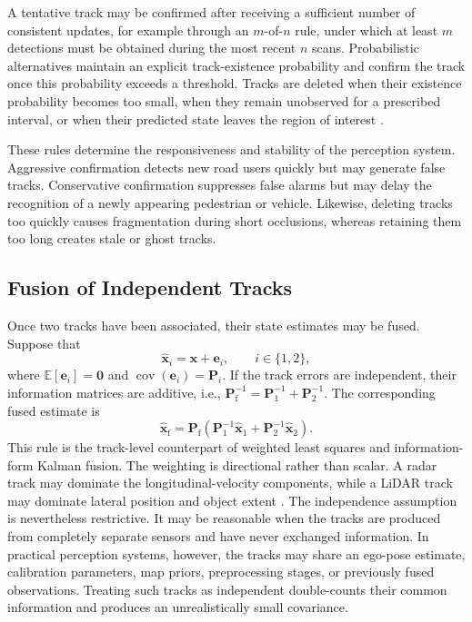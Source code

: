 \documentclass[11pt,oneside,openany]{book}
\begin{document}
A tentative track may be confirmed after receiving a sufficient number of
consistent updates, for example through an $m$-of-$n$ rule, under which at
least $m$ detections must be obtained during the most recent $n$ scans.
Probabilistic alternatives maintain an explicit track-existence
probability and confirm the track once this probability exceeds a
threshold. Tracks are deleted when their existence probability becomes too
small, when they remain unobserved for a prescribed interval, or when their
predicted state leaves the region of interest
\cite{blackman1999design,barshalom2011tracking}.

These rules determine the responsiveness and stability of the perception
system. Aggressive confirmation detects new road users quickly but may
generate false tracks. Conservative confirmation suppresses false alarms
but may delay the recognition of a newly appearing pedestrian or vehicle.
Likewise, deleting tracks too quickly causes fragmentation during short
occlusions, whereas retaining them too long creates stale or ghost tracks.

\subsection{Fusion of Independent Tracks}

Once two tracks have been associated, their state estimates may be fused.
Suppose that
\begin{equation}
\widehat{\mathbf{x}}_{i}=\mathbf{x}+\mathbf{e}_{i},\qquad i\in\{1,2\},
\label{eq:local-track-error}
\end{equation}
where
$\mathbb{E}[\mathbf{e}_{i}]=\mathbf{0}$ and $\operatorname{cov}(\mathbf{e}_{i})=\mathbf{P}_{i}$. If the track errors are independent, their information matrices are
additive, i.e.,  $\mathbf{P}_{\mathrm{f}}^{-1}=\mathbf{P}_{1}^{-1}+\mathbf{P}_{2}^{-1}$. The corresponding fused estimate is
\begin{equation}
\widehat{\mathbf{x}}_{\mathrm{f}}=\mathbf{P}_{\mathrm{f}}\left(\mathbf{P}_{1}^{-1}\widehat{\mathbf{x}}_{1}+\mathbf{P}_{2}^{-1}\widehat{\mathbf{x}}_{2}\right).
\label{eq:independent-track-fusion-state}
\end{equation}
This rule is the track-level counterpart of weighted least squares and information-form Kalman fusion. The weighting is directional rather than scalar. A radar track may dominate the longitudinal-velocity components, while a LiDAR track may dominate lateral position and object extent
\cite{barshalom1995multitarget,barshalom2011tracking}. The independence assumption is nevertheless restrictive. It may be
reasonable when the tracks are produced from completely separate sensors
and have never exchanged information. In practical perception systems,
however, the tracks may share an ego-pose estimate, calibration parameters,
map priors, preprocessing stages, or previously fused observations.
Treating such tracks as independent double-counts their common information
and produces an unrealistically small covariance.
\end{document}
